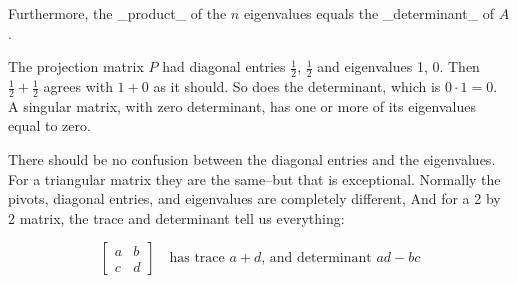Furthermore, the _product_ of the \(n\) eigenvalues equals the _determinant_ of \(A\).

The projection matrix \(P\) had diagonal entries \(\tfrac{1}{2}\), \(\tfrac{1}{2}\) and eigenvalues 1, 0. Then \(\tfrac{1}{2}+\tfrac{1}{2}\) agrees with \(1+0\) as it should. So does the determinant, which is \(0\cdot 1=0\). A singular matrix, with zero determinant, has one or more of its eigenvalues equal to zero.

There should be no confusion between the diagonal entries and the eigenvalues. For a triangular matrix they are the same--but that is exceptional. Normally the pivots, diagonal entries, and eigenvalues are completely different, And for a 2 by 2 matrix, the trace and determinant tell us everything:

\[\begin{bmatrix}a&b\\ c&d\end{bmatrix}\quad\text{has trace $a+d$, and determinant $ad-bc$}\] 